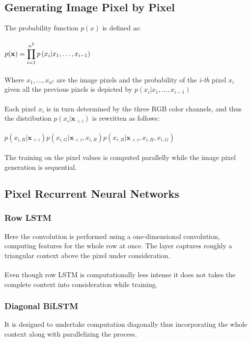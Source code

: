 \documentclass{article}
\begin{document}
\subsection{Generating Image Pixel by Pixel}
The probability function $p(x)$ is defined as:\\
\\
$\mathlarger{p ( \mathbf { x } ) = \prod _ { i = 1 } ^ { n ^ { 2 } } p \left( x _ { i } | x _ { 1 } , \ldots , x _ { i - 1 } \right)}$\\
\\
Where $x _ { 1 } , \dots , x _ { n ^ { 2 } }$ are the image pixels and the probability of the \textit{i-th} pixel $x _ { i }$ given all the previous pixels is depicted by $p \left( x _ { i } | x _ { 1 } , \dots , x _ { i - 1 } \right)$\\
\\
Each pixel $x _ { i }$ is in turn determined by the three RGB color channels, and thus the distribution $p \left( x _ { i } | \mathbf { x } _ { < i } \right)$ is rewritten as follows:\\
\\
$p \left( x _ { i , R } | \mathbf { x } _ { < i } \right) p \left( x _ { i , G } | \mathbf { x } _ { < i } , x _ { i , R } \right) p \left( x _ { i , B } | \mathbf { x } _ { < i } , x _ { i , R } , x _ { i , G } \right)$\\
\\
The training on the pixel values is computed parallelly while the image pixel generation is sequential.





\subsection{Pixel Recurrent Neural Networks}
\subsubsection{Row LSTM}
Here the convolution is performed using a one-dimensional convolution, computing features for the whole row at once. The layer captures roughly a triangular context above the pixel under consideration.\\
\\
Even though row LSTM is computationally less intense it does not takes the complete context into consideration while training.


\subsubsection{Diagonal BiLSTM}
It is designed to undertake computation diagonally thus incorporating the whole context along with parallelizing the process.
\end{document}
